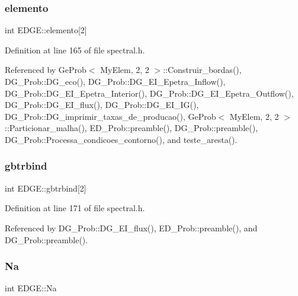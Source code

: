 \mbox{\label{structEDGE_a60c9d8cbc65e29ca791d0e46f62e3806}} 
\subsubsection{\texorpdfstring{elemento}{elemento}}
{\footnotesize\ttfamily int E\+D\+G\+E\+::elemento\mbox{[}2\mbox{]}}



Definition at line 165 of file spectral.\+h.



Referenced by Ge\+Prob$<$ My\+Elem, 2, 2 $>$\+::\+Construir\+\_\+bordas(), D\+G\+\_\+\+Prob\+::\+D\+G\+\_\+eco(), D\+G\+\_\+\+Prob\+::\+D\+G\+\_\+\+E\+I\+\_\+\+Epetra\+\_\+\+Inflow(), D\+G\+\_\+\+Prob\+::\+D\+G\+\_\+\+E\+I\+\_\+\+Epetra\+\_\+\+Interior(), D\+G\+\_\+\+Prob\+::\+D\+G\+\_\+\+E\+I\+\_\+\+Epetra\+\_\+\+Outflow(), D\+G\+\_\+\+Prob\+::\+D\+G\+\_\+\+E\+I\+\_\+flux(), D\+G\+\_\+\+Prob\+::\+D\+G\+\_\+\+E\+I\+\_\+\+I\+G(), D\+G\+\_\+\+Prob\+::\+D\+G\+\_\+imprimir\+\_\+taxas\+\_\+de\+\_\+producao(), Ge\+Prob$<$ My\+Elem, 2, 2 $>$\+::\+Particionar\+\_\+malha(), E\+D\+\_\+\+Prob\+::preamble(), D\+G\+\_\+\+Prob\+::preamble(), D\+G\+\_\+\+Prob\+::\+Processa\+\_\+condicoes\+\_\+contorno(), and teste\+\_\+aresta().

\mbox{\label{structEDGE_ad7e004eef079a66034a4d3a3d5c2a62e}} 
\subsubsection{\texorpdfstring{gbtrbind}{gbtrbind}}
{\footnotesize\ttfamily int E\+D\+G\+E\+::gbtrbind\mbox{[}2\mbox{]}}



Definition at line 171 of file spectral.\+h.



Referenced by D\+G\+\_\+\+Prob\+::\+D\+G\+\_\+\+E\+I\+\_\+flux(), E\+D\+\_\+\+Prob\+::preamble(), and D\+G\+\_\+\+Prob\+::preamble().

\mbox{\label{structEDGE_a408340cfa46d83d300c4ed8b2900d30e}} 
\subsubsection{\texorpdfstring{Na}{Na}}
{\footnotesize\ttfamily int E\+D\+G\+E\+::\+Na}



